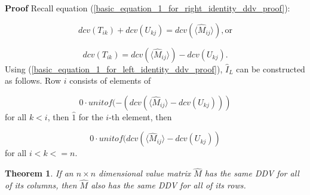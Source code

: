 \documentclass[10pt,letterpaper]{article}
\newtheorem{thm}{Theorem}[section]
\newenvironment{proof}{\noindent\textbf{Proof} }{\qed \newline}
\newcommand{\qed}{\nobreak \ifvmode \relax \else
      \ifdim\lastskip<1.5em \hskip-\lastskip
      \hskip1.5em plus0em minus0.5em \fi \nobreak
      \vrule height0.75em width0.5em depth0.25em\fi}
\numberwithin{equation}{section}
\begin{document}
\begin{proof} Recall equation
  (\ref{basic_equation_1_for_right_identity_ddv_proof}):

  \[ dcv(T_{ik}) + dcv(U_{kj}) = dcv( \langle \hat M_{ij} \rangle ) ,
  \mbox{or} \]

  \begin{equation} dcv(T_{ik}) = dcv( \langle \hat M_{ij} \rangle ) -
    dcv(U_{kj}) . \end{equation} Using
  (\ref{basic_equation_1_for_left_identity_ddv_proof}), $\hat I_L$ can
  be constructed as follows.  Row $i$ consists of elements of

  \[ 0 \cdot unitof( -(dcv( \langle \hat M_{ij} \rangle -
  dcv(U_{kj}))) \] for all $k < i$, then $\hat 1$ for the $i$-th
  element, then

  \[ 0 \cdot unitof( dcv( \langle \hat M_{ij} \rangle -
  dcv(U_{kj})) \] for all $i < k <= n$. \end{proof}

\begin{thm} \label{if_same_col_ddvs_then_same_row_ddvs} If an $n
  \times n$ dimensional value matrix $\hat M$ has the same DDV for all
  of its columns, then $\hat M$ also has the same DDV for all of its
  rows.\end{thm}
\end{document}
